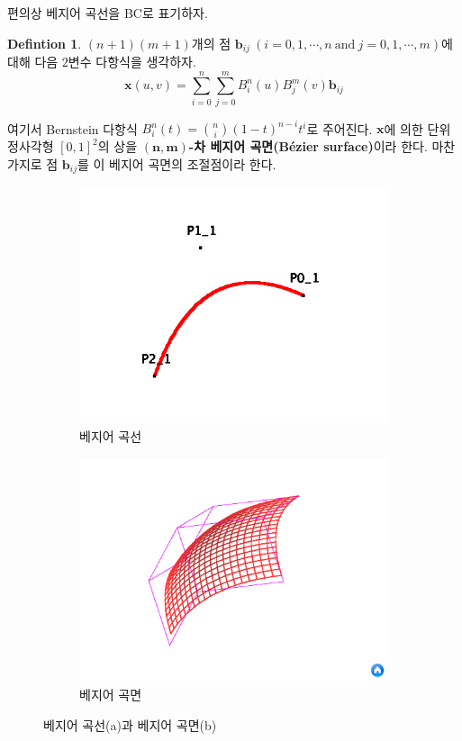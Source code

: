 \documentclass[10pt]{gshs-report-v2.0}
\theoremstyle{theorem}
\theoremstyle{lemma}
\theoremstyle{definition}
\newtheorem{definition}[theorem]{Defintion}
\begin{document}
편의상 베지어 곡선을 BC로 표기하자.

\begin{definition} \label{BS}
	$(n+1)(m+1)$개의 점 $\mathbf{b}_{ij}\ (i=0, 1, \cdots, n\ \mathrm{and}\ j=0, 1, \cdots, m)$에 대해 다음 $2$변수 다항식을 생각하자. 
	\begin{equation}
		\mathbf{x}(u, v)=\sum_{i=0}^n\sum_{j=0}^m B_i^n(u)B_j^m(v)\mathbf{b}_{ij} 
	\end{equation}
	
	여기서 Bernstein 다항식 $B_i^n(t)=\binom ni(1-t)^{n-i}t^i$로 주어진다. $\mathbf{x}$에 의한 단위 정사각형 $[0, 1]^2$의 상을 \textbf{$\boldsymbol{(n, m)}$-차 베지어 곡면(Bézier surface)}이라 한다. 마찬가지로 점 $\mathbf{b}_{ij}$를 이 베지어 곡면의 조절점이라 한다.\cite{Farin}
\end{definition}

\begin{figure}[h]
	\centering
	\begin{subfigure}[b]{.45\textwidth}
		\centering
		\includegraphics[width=\textwidth]{BC}
		\caption{베지어 곡선}
	\end{subfigure}
	\hfill
	\begin{subfigure}[b]{.45\textwidth}
		\centering
		\includegraphics[width=\textwidth]{BS}
		\caption{베지어 곡면}
	\end{subfigure}
	\caption{베지어 곡선(a)과 베지어 곡면(b)}
\end{figure}
\end{document}
